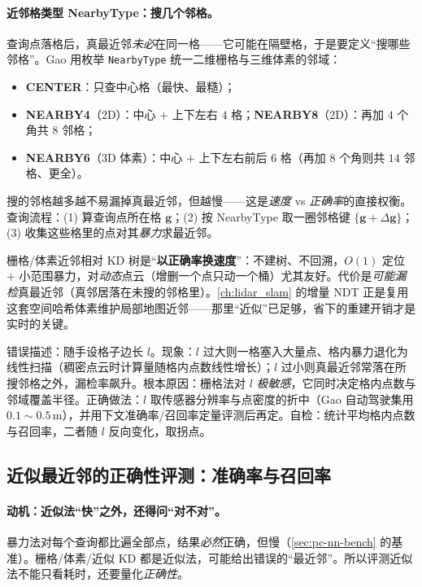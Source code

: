 \paragraph{近邻格类型 NearbyType：搜几个邻格。}
查询点落格后，真最近邻\emph{未必}在同一格——它可能在隔壁格，于是要定义“搜哪些邻格”。Gao 用枚举 \texttt{NearbyType} 统一二维栅格与三维体素的邻域：
\begin{itemize}
  \item \textbf{CENTER}：只查中心格（最快、最糙）；
  \item \textbf{NEARBY4}（2D）：中心 $+$ 上下左右 $4$ 格；\textbf{NEARBY8}（2D）：再加 $4$ 个角共 $8$ 邻格；
  \item \textbf{NEARBY6}（3D 体素）：中心 $+$ 上下左右前后 $6$ 格（再加 $8$ 个角则共 $14$ 邻格、更全）。
\end{itemize}
搜的邻格越多越不易漏掉真最近邻，但越慢——这是\emph{速度} vs \emph{正确率}的直接权衡。查询流程：(1) 算查询点所在格 $\mathbf{g}$；(2) 按 NearbyType 取一圈邻格键 $\{\mathbf{g}+\Delta\mathbf{g}\}$；(3) 收集这些格里的点对其\emph{暴力}求最近邻。

\begin{insight}
栅格/体素近邻相对 KD 树是“\textbf{以正确率换速度}”：不建树、不回溯，$O(1)$ 定位 $+$ 小范围暴力，对\emph{动态}点云（增删一个点只动一个桶）尤其友好。代价是\emph{可能漏检}真最近邻（真邻居落在未搜的邻格里）。\cref{ch:lidar_slam} 的增量 NDT 正是复用这套空间哈希体素维护局部地图近邻——那里“近似”已足够，省下的重建开销才是实时的关键。
\end{insight}

\begin{pitfall}
错误描述：随手设格子边长 $l$。现象：$l$ 过大则一格塞入大量点、格内暴力退化为线性扫描（稠密点云时计算量随格内点数线性增长）；$l$ 过小则真最近邻常落在所搜邻格之外，漏检率飙升。根本原因：栅格法对 $l$ \emph{极敏感}，它同时决定格内点数与邻域覆盖半径。正确做法：$l$ 取传感器分辨率与点密度的折中（Gao 自动驾驶集用 $0.1\sim0.5\,\mathrm{m}$），并用下文准确率/召回率定量评测后再定。自检：统计平均格内点数与召回率，二者随 $l$ 反向变化，取拐点。
\end{pitfall}

\subsection{近似最近邻的正确性评测：准确率与召回率}
\label{sec:pc-nn-eval}

\paragraph{动机：近似法“快”之外，还得问“对不对”。}
暴力法对每个查询都比遍全部点，结果\emph{必然}正确，但慢（\cref{sec:pc-nn-bench} 的基准）。栅格/体素/近似 KD 都是近似法，可能给出错误的“最近邻”。所以评测近似法不能只看耗时，还要量化\emph{正确性}\cite{gao2023slamad}。

